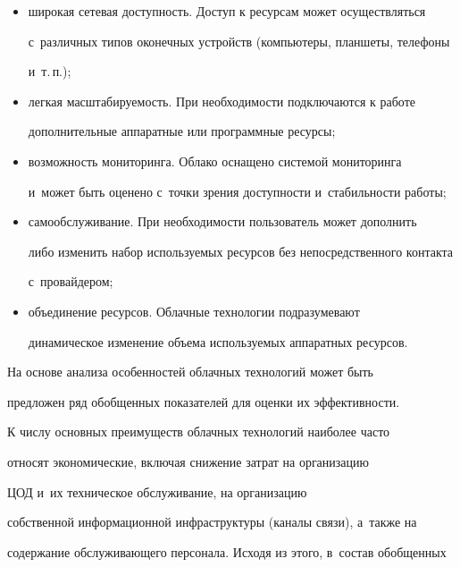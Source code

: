   \begin{itemize}

\item  широкая сетевая доступность. Доступ к ресурсам может осуществляться 

с~различных типов оконечных устройств (компьютеры, планшеты, телефоны 

и~т.\,п.);\\[-8pt]

  \item легкая масштабируемость. При необходимости подключаются к работе 

дополнительные аппаратные или программные ресурсы;\\[-8pt]

  \item возможность мониторинга. Облако оснащено системой мониторинга 

и~может быть оценено с~точки зрения доступности и~стабильности работы;\\[-8pt]

  \item самообслуживание. При необходимости пользователь может дополнить 

либо изменить набор используемых ресурсов без непосредственного контакта 

с~провайдером;\\[-8pt]

  \item объединение ресурсов. Облачные технологии подразумевают 

динамическое изменение объема используемых аппаратных ресурсов. 

  \end{itemize}

  

  На основе анализа особенностей облачных технологий может быть 

предложен ряд обобщенных показателей для оценки их эффективности.

  

  К числу основных преимуществ облачных технологий наиболее часто 

относят экономические, включая снижение затрат на организацию 

ЦОД и~их техническое обслуживание, на организацию 

собственной информационной инфраструктуры (каналы связи), а~также на 

содержание обслуживающего персонала. Исходя из этого, в~состав обобщенных 

